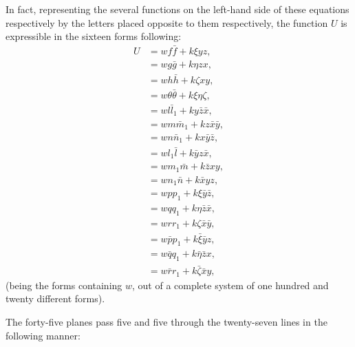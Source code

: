 \documentclass[11pt,a4paper]{book}
\begin{document}
In fact, representing the several functions on the left-hand side of these equations respectively by the letters placed opposite to them respectively, the function $U$ is expressible in the sixteen forms following:
\begin{align*}
U &= wf\bar{f} + k\xi yz, \\
  &= wg\bar{g} + k\eta zx, \\
  &= wh\bar{h} + k\zeta xy, \\
  &= w\theta\bar{\theta} + k\xi\eta\zeta, \\
  &= wl\bar{l}_1 + ky\bar{z}\bar{x}, \\
  &= wm\bar{m}_1 + kz\bar{x}\bar{y}, \\
  &= wn\bar{n}_1 + kx\bar{y}\bar{z}, \\
  &= wl_1\bar{l} + k\bar{y}z\bar{x}, \\
  &= wm_1\bar{m} + k\bar{z}xy, \\
  &= wn_1\bar{n} + k\bar{x}yz, \\
  &= wpp_1 + k\xi\bar{y}\bar{z}, \\
  &= wqq_1 + k\eta\bar{z}\bar{x}, \\
  &= wrr_1 + k\zeta\bar{x}\bar{y}, \\
  &= w\bar{p}p_1 + k\bar{\xi}\bar{y}z, \\
  &= w\bar{q}q_1 + k\bar{\eta}\bar{z}x, \\
  &= w\bar{r}r_1 + k\bar{\zeta}\bar{x}y,
\end{align*}
(being the forms containing $w$, out of a complete system of one hundred and twenty different forms).

The forty-five planes pass five and five through the twenty-seven lines in the following manner:
\medskip
\end{document}
